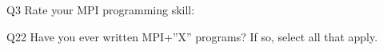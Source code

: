 \begin{description}%
\item{Q3} Rate your MPI programming skill:%
\item{Q22} Have you ever written MPI+”X” programs? If so, select all that apply.%
\end{description}%
